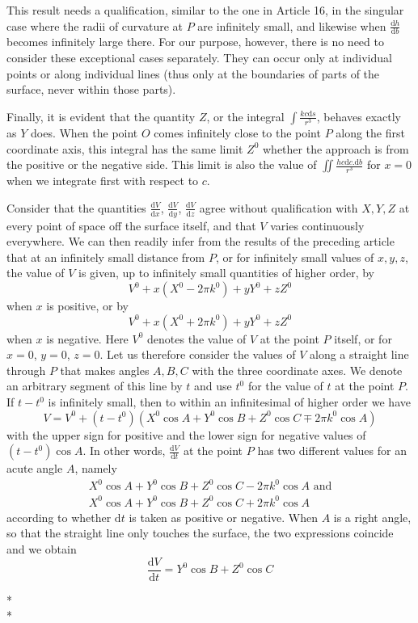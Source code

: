 This result needs a qualification, similar to the one in Article 16, in the singular case where the radii of curvature at $P$ are infinitely small, and likewise when $\frac{\mathrm dh}{\mathrm db}$ becomes infinitely large there. For our purpose, however, there is no need to consider these exceptional cases separately. They can occur only at individual points or along individual lines (thus only at the boundaries of parts of the surface, never within those parts).

Finally, it is evident that the quantity $Z$, or the integral $\int\frac{kc\mathrm ds}{r^3}$, behaves exactly as $Y$ does. When the point $O$ comes infinitely close to the point $P$ along the first coordinate axis, this integral has the same limit $Z^0$ whether the approach is from the positive or the negative side. This limit is also the value of $\iint\frac{hc\mathrm dc.\mathrm db}{r^3}$ for $x=0$ when we integrate first with respect to $c$.

%


Consider that the quantities $\frac{\mathrm dV}{\mathrm dx}$, $\frac{\mathrm dV}{\mathrm dy}$, $\frac{\mathrm dV}{\mathrm dz}$ agree without qualification with $X,Y,Z$ at every point of space off the surface itself, and that $V$ varies continuously everywhere. We can then readily infer from the results of the preceding article that at an infinitely small distance from $P$, or for infinitely small values of $x,y,z$, the value of $V$ is given, up to infinitely small quantities of higher order, by
\[
V^0+x(X^0-2\pi k^0)+yY^0+zZ^0
\]
when $x$ is positive, or by
\[
V^0+x(X^0+2\pi k^0)+yY^0+zZ^0
\]
when $x$ is negative. Here $V^0$ denotes the value of $V$ at the point $P$ itself, or for $x=0$, $y=0$, $z=0$. Let us therefore consider the values of $V$ along a straight line through $P$ that makes angles $A,B,C$ with the three coordinate axes. We denote an arbitrary segment of this line by $t$ and use $t^0$ for the value of $t$ at the point $P$.
If $t-t^0$ is infinitely small, then to within an infinitesimal of higher order we have
\[
V=V^0+(t-t^0)(X^0\cos A+Y^0\cos B+Z^0\cos C\mp2\pi k^0\cos A)
\]
with the upper sign for positive and the lower sign for negative values of $(t-t^0)\cos A$. In other words, $\frac{\mathrm dV}{\mathrm dt}$ at the point $P$ has two different values for an acute angle $A$, namely
\[
\begin{gathered}
X^0\cos A+Y^0\cos B+Z^0\cos C-2\pi k^0\cos A\text{ and}\\
X^0\cos A+Y^0\cos B+Z^0\cos C+2\pi k^0\cos A
\end{gathered}
\]
according to whether $\mathrm dt$ is taken as positive or negative. When $A$ is a right angle, so that the straight line only touches the surface, the two expressions coincide and we obtain
\[
\frac{\mathrm dV}{\mathrm dt}=Y^0\cos B+Z^0\cos C
\]
\begin{center}*\qquad\qquad*\\{}*\end{center}

